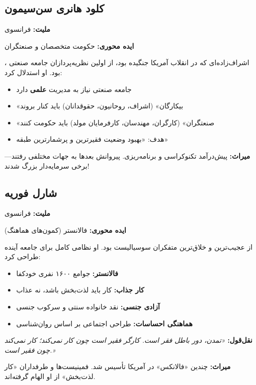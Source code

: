 \subsection{کلود هانری سن‌سیمون}

\begin{personbox}

\textbf{ملیت:} فرانسوی

\textbf{ایده محوری:} حکومت متخصصان و صنعتگران

\mediumspace

، اشراف‌زاده‌ای که در انقلاب آمریکا جنگیده بود، از اولین نظریه‌پردازان جامعه صنعتی بود. او استدلال کرد:

\begin{itemize}[nosep]
    \item جامعه صنعتی نیاز به مدیریت \textbf{علمی} دارد
    \item «بیکارگان» (اشراف، روحانیون، حقوقدانان) باید کنار بروند
    \item «صنعتگران» (کارگران، مهندسان، کارفرمایان مولد) باید حکومت کنند
    \item هدف: «بهبود وضعیت فقیرترین و پرشمارترین طبقه»
\end{itemize}

\mediumspace

\textbf{میراث:} پیش‌درآمد تکنوکراسی و برنامه‌ریزی. پیروانش بعدها به جهات مختلفی رفتند—برخی سرمایه‌دار بزرگ شدند!
\end{personbox}

\subsection{شارل فوریه}

\begin{personbox}

\textbf{ملیت:} فرانسوی

\textbf{ایده محوری:} فالانستر (کمون‌های هماهنگ)

\mediumspace

 از عجیب‌ترین و خلاق‌ترین متفکران سوسیالیست بود. او نظامی کامل برای جامعه آینده طراحی کرد:

\begin{itemize}[nosep]
    \item \textbf{فالانستر:} جوامع ۱۶۰۰ نفری خودکفا
    \item \textbf{کار جذاب:} کار باید لذت‌بخش باشد، نه عذاب
    \item \textbf{آزادی جنسی:} نقد خانواده سنتی و سرکوب جنسی
    \item \textbf{هماهنگی احساسات:} طراحی اجتماعی بر اساس روان‌شناسی
\end{itemize}

\mediumspace

\textbf{نقل‌قول:} \textit{«تمدن، دور باطل فقر است. کارگر فقیر است چون کار نمی‌کند؛ کار نمی‌کند چون فقیر است.»}

\mediumspace

\textbf{میراث:} چندین «فالانکس» در آمریکا تأسیس شد. فمینیست‌ها و طرفداران «کار لذت‌بخش» از او الهام گرفته‌اند.
\end{personbox}

